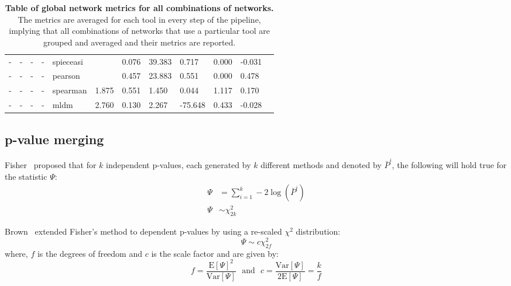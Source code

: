\begin{landscape}
\begin{table}[H]
\begin{tabular}{|l|p{1cm}|p{1cm}|p{1cm}|p{2cm}|p{1.5cm}|p{1.5cm}|p{1.5cm}|p{1.5cm}|p{1.5cm}|p{1.5cm}|p{1.5cm}|}
  -  & -             & -                 & -           & spieceasi  &                              & 0.076              & 39.383                      & 0.717      & 0.000             & -0.031                           \\
  -  & -             & -                 & -           & pearson    &                              & 0.457              & 23.883                      & 0.551      & 0.000             & 0.478                            \\
  -  & -             & -                 & -           & spearman   & 1.875                        & 0.551              & 1.450                       & 0.044      & 1.117             & 0.170                            \\
  -  & -             & -                 & -           & mldm       & 2.760                        & 0.130              & 2.267                       & -75.648    & 0.433             & -0.028                           \\ \hline
  \end{tabular}
  \caption{
    \textbf{Table of global network metrics for all combinations of networks.}
    The metrics are averaged for each tool in every step of the pipeline, implying that all combinations of networks that use a particular tool are grouped and averaged and their metrics are reported.
  }
  \label{tab:network_metrics}
  \end{table}
  \end{landscape}


  \subsection*{p-value merging}

  Fisher~\cite{fisher_224a_1948} proposed that for $k$ independent p-values, each generated by $k$ different methods and denoted by $\bar{P}^i$, the following will hold true for the statistic $\Psi$:
  \begin{equation*}
    \begin{aligned}
      \Psi &= \sum_{i=1}^k -2 \log \left( \bar{P}^i \right) \\
        \Psi &\sim \chi^2_{2k}
    \end{aligned}
  \end{equation*}

  Brown~\cite{brown_400_1975} extended Fisher's method to dependent p-values by using a re-scaled $\chi^2$ distribution:
  \begin{equation*}
    \Psi \sim c \chi^2_{2f}
  \end{equation*}
  where, $f$ is the degrees of freedom and $c$ is the scale factor and are given by:
  \begin{equation*}
    f = \frac{\mathrm{E}[\Psi]^2}{\mathrm{Var}[\Psi]} ~~~\text{and}~~~ c = \frac{\mathrm{Var}[\Psi]}{2\mathrm{E}[\Psi]} = \frac{k}{f}
  \end{equation*}

